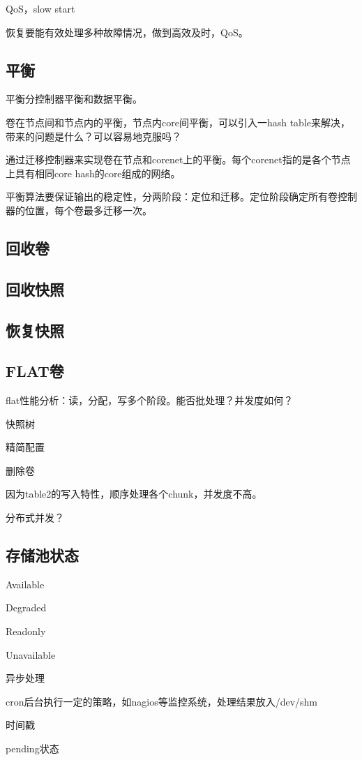 QoS，slow start

恢复要能有效处理多种故障情况，做到高效及时，QoS。

\subsection{平衡}

平衡分控制器平衡和数据平衡。

卷在节点间和节点内的平衡，节点内core间平衡，可以引入一hash table来解决，
带来的问题是什么？可以容易地克服吗？

通过迁移控制器来实现卷在节点和corenet上的平衡。每个corenet指的是各个节点上具有相同core hash的core组成的网络。

平衡算法要保证输出的稳定性，分两阶段：定位和迁移。定位阶段确定所有卷控制器的位置，每个卷最多迁移一次。

\subsection{回收卷}

\subsection{回收快照}

\subsection{恢复快照}

\subsection{FLAT卷}

flat性能分析：读，分配，写多个阶段。能否批处理？并发度如何？

快照树

精简配置

删除卷

因为table2的写入特性，顺序处理各个chunk，并发度不高。

分布式并发？

\subsection{存储池状态}

\begin{compactitem}
\item Available
\item Degraded
\item Readonly
\item Unavailable
\end{compactitem}

异步处理

cron后台执行一定的策略，如nagios等监控系统，处理结果放入/dev/shm

时间戳

pending状态
